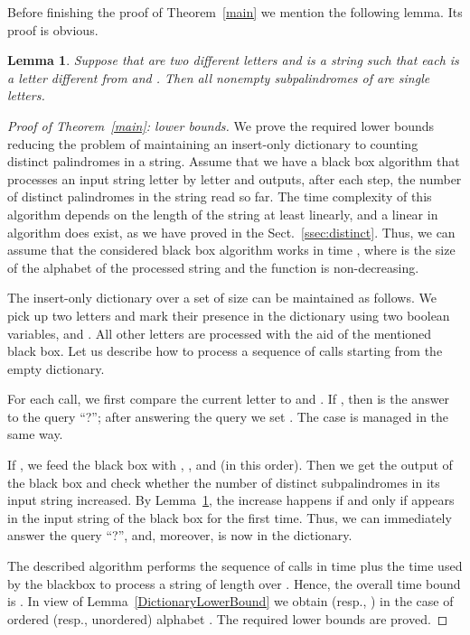 \documentclass{article}
\theoremstyle{plain}
\newtheorem{lemma}{Lemma}[section]
\theoremstyle{definition}
\begin{document}
Before finishing the proof of Theorem~\ref{main} we mention the following lemma. Its proof is obvious.

\begin{lemma} \label{abx}
Suppose that  are two different letters and  is a string such that each  is a letter different from  and . Then all nonempty subpalindromes of  are single letters.
\end{lemma}

\begin{proof}[Proof of Theorem~\ref{main}: lower bounds]
We prove the required lower bounds reducing the problem of maintaining an insert-only dictionary to counting distinct palindromes in a string. Assume that we have a black box algorithm that processes an input string letter by letter and outputs, after each step, the number of distinct palindromes in the string read so far. The time complexity of this algorithm depends on the length  of the string at least linearly, and a linear in  algorithm does exist, as we have proved in the Sect.~\ref{ssec:distinct}. Thus, we can assume that the considered black box algorithm works in time , where  is the size of the alphabet of the processed string and the function  is non-decreasing.

The insert-only dictionary over a set  of size  can be maintained as follows. We pick up two letters  and mark their presence in the dictionary using two boolean variables,  and . All other letters are processed with the aid of the mentioned black box. Let us describe how to process a sequence of  calls  starting from the empty dictionary.

For each call, we first compare the current letter  to  and . If , then  is the answer to the query ``?''; after answering the query we set . The case  is managed in the same way.

If , we feed the black box with , , and  (in this order). Then we get the output of the black box and check whether the number of distinct subpalindromes in its input string increased. By Lemma~\ref{abx}, the increase happens if and only if  appears in the input string of the black box for the first time. Thus, we can immediately answer the query ``?'', and, moreover,  is now in the dictionary.

The described algorithm performs the sequence of calls  in time  plus the time used by the blackbox to process a string of length  over . Hence, the overall time bound is . In view of Lemma~\ref{DictionaryLowerBound} we obtain  (resp., ) in the case of ordered (resp., unordered) alphabet . The required lower bounds are proved.
\end{proof}

                      
\end{document}
